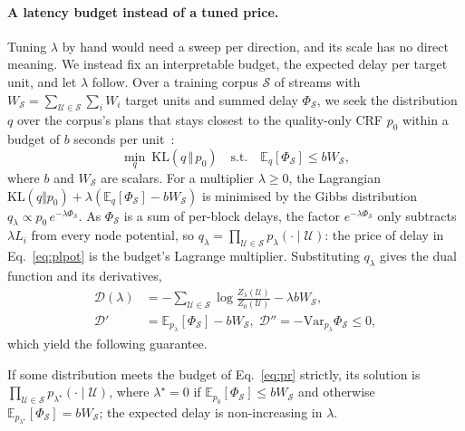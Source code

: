 \paragraph{A latency budget instead of a tuned price.} Tuning $\lambda$ by hand would need a sweep per direction, and its
scale has no direct meaning. We instead fix an interpretable budget, the expected delay per target unit, and let
$\lambda$ follow. Over a training corpus $\mathcal{S}$ of streams with $W_\mathcal{S}=\sum_{\mathcal{U}\in\mathcal{S}}\sum_i
W_i$ target units and summed delay $\Phi_\mathcal{S}$, we seek the distribution $q$ over the corpus's plans that stays
closest to the quality-only CRF $p_0$ within a budget of $b$ seconds per unit~\citep{ganchev2010posterior}:
\begin{equation}
\min_q\ \mathrm{KL}(q\,\Vert\,p_0)\quad\text{s.t.}\quad\mathbb{E}_q[\Phi_\mathcal{S}]\le bW_\mathcal{S},
\label{eq:pr}
\end{equation}
where $b$ and $W_\mathcal{S}$ are scalars. For a multiplier $\lambda\ge0$, the Lagrangian
$\mathrm{KL}(q\Vert p_0)+\lambda(\mathbb{E}_q[\Phi_\mathcal{S}]-bW_\mathcal{S})$ is minimised by the Gibbs distribution
$q_\lambda\propto p_0\,e^{-\lambda\Phi_\mathcal{S}}$. As $\Phi_\mathcal{S}$ is a sum of per-block delays, the factor
$e^{-\lambda\Phi_\mathcal{S}}$ only subtracts $\lambda L_i$ from every node potential, so
$q_\lambda=\prod_{\mathcal{U}\in\mathcal{S}}p_\lambda(\cdot\mid\mathcal{U})$: the price of delay in Eq.~\eqref{eq:plpot} is
the budget's Lagrange multiplier. Substituting $q_\lambda$ gives the dual function and its derivatives,
\begin{equation}
\begin{aligned}
\mathcal{D}(\lambda)&=-\textstyle\sum_{\mathcal{U}\in\mathcal{S}}\log\frac{Z_\lambda(\mathcal{U})}{Z_0(\mathcal{U})}-\lambda bW_\mathcal{S},\\
\mathcal{D}'&=\mathbb{E}_{p_\lambda}[\Phi_\mathcal{S}]-bW_\mathcal{S},\;
\mathcal{D}''=-\mathrm{Var}_{p_\lambda}\Phi_\mathcal{S}\le0,
\end{aligned}
\label{eq:dual}
\end{equation}
which yield the following guarantee.

\begin{proposition}
\label{prop:pr}
If some distribution meets the budget of Eq.~\eqref{eq:pr} strictly, its solution is
$\prod_{\mathcal{U}\in\mathcal{S}}p_{\lambda^\star}(\cdot\mid\mathcal{U})$, where $\lambda^\star=0$ if
$\mathbb{E}_{p_0}[\Phi_\mathcal{S}]\le bW_\mathcal{S}$ and otherwise
$\mathbb{E}_{p_{\lambda^\star}}[\Phi_\mathcal{S}]=bW_\mathcal{S}$; the expected delay is non-increasing in $\lambda$.
\end{proposition}

